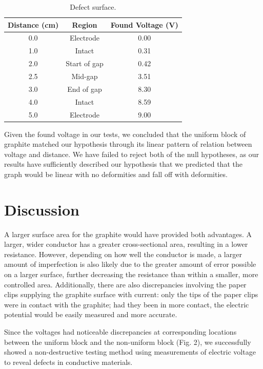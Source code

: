 \documentclass[10pt,draftcls,journal,onecolumn]{IEEEtran}
\begin{document}
\begin{table}[H]
\caption{Defect surface.}
\label{tab:defect}
\begin{center}
\begin{tabular}{ccc}
\toprule
Distance (\unit{\centi\meter}) & Region & Found Voltage (\unit{\volt}) \\
\midrule
0.0 & Electrode    & 0.00 \\
1.0 & Intact       & 0.31 \\
2.0 & Start of gap & 0.42 \\
2.5 & Mid-gap      & 3.51 \\
3.0 & End of gap   & 8.30 \\
4.0 & Intact       & 8.59 \\
5.0 & Electrode    & 9.00 \\
\bottomrule
\end{tabular}
\end{center}
\end{table}

Given the found voltage in our tests, we concluded that the uniform block of graphite matched our hypothesis through its linear pattern of relation between voltage and distance. We have failed to reject both of the null hypotheses, as our results have sufficiently described our hypothesis that we predicted that the graph would be linear with no deformities and fall off with deformities.

\section{Discussion}

A larger surface area for the graphite would have provided both advantages. A larger, wider conductor has a greater cross-sectional area, resulting in a lower resistance. However, depending on how well the conductor is made, a larger amount of imperfection is also likely due to the greater amount of error possible on a larger surface, further decreasing the resistance than within a smaller, more controlled area. Additionally, there are also discrepancies involving the paper clips supplying the graphite surface with current: only the tips of the paper clips were in contact with the graphite; had they been in more contact, the electric potential would be easily measured and more accurate.

Since the voltages had noticeable discrepancies at corresponding locations between the uniform block and the non-uniform block (Fig. 2), we successfully showed a non-destructive testing method using measurements of electric voltage to reveal defects in conductive materials.
\end{document}
